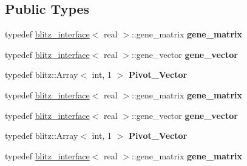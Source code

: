 \subsection*{Public Types}
\begin{DoxyCompactItemize}
\item 
\mbox{\label{classblitz___l_u__solve__interface_a9cca961da94b2f5ab7c4153d90e6ed00}} 
typedef \hyperlink{classblitz__interface}{blitz\+\_\+interface}$<$ real $>$\+::gene\+\_\+matrix {\bfseries gene\+\_\+matrix}
\item 
\mbox{\label{classblitz___l_u__solve__interface_ac862c1169c7df1756379a78763594345}} 
typedef \hyperlink{classblitz__interface}{blitz\+\_\+interface}$<$ real $>$\+::gene\+\_\+vector {\bfseries gene\+\_\+vector}
\item 
\mbox{\label{classblitz___l_u__solve__interface_a29fb02ff26df347be16bda17d851b47f}} 
typedef blitz\+::\+Array$<$ int, 1 $>$ {\bfseries Pivot\+\_\+\+Vector}
\item 
\mbox{\label{classblitz___l_u__solve__interface_a9cca961da94b2f5ab7c4153d90e6ed00}} 
typedef \hyperlink{classblitz__interface}{blitz\+\_\+interface}$<$ real $>$\+::gene\+\_\+matrix {\bfseries gene\+\_\+matrix}
\item 
\mbox{\label{classblitz___l_u__solve__interface_ac862c1169c7df1756379a78763594345}} 
typedef \hyperlink{classblitz__interface}{blitz\+\_\+interface}$<$ real $>$\+::gene\+\_\+vector {\bfseries gene\+\_\+vector}
\item 
\mbox{\label{classblitz___l_u__solve__interface_a29fb02ff26df347be16bda17d851b47f}} 
typedef blitz\+::\+Array$<$ int, 1 $>$ {\bfseries Pivot\+\_\+\+Vector}
\item 
\mbox{\label{classblitz___l_u__solve__interface_a9cca961da94b2f5ab7c4153d90e6ed00}} 
typedef \hyperlink{classblitz__interface}{blitz\+\_\+interface}$<$ real $>$\+::gene\+\_\+matrix {\bfseries gene\+\_\+matrix}
\item 
\mbox{\label{classblitz___l_u__solve__interface_ac862c1169c7df1756379a78763594345}} 

\end{DoxyCompactItemize}
